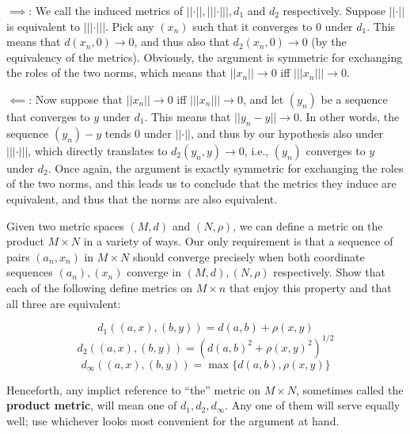 \begin{solution}
    \newcommand{\trvert}[1]{\lvert \lvert \lvert #1 \rvert \rvert \rvert}

    $\implies$: We call the induced metrics of $\lvert \lvert \cdot \rvert \rvert, \trvert{\cdot}, d_1$ and $d_2$ respectively. 
    Suppose $\lvert \lvert \cdot \rvert \rvert$ is equivalent to $\trvert{\cdot}$.
    Pick any $(x_n)$ such that it converges to 0 under $d_1$.
    This means that $d(x_n, 0) \rightarrow 0$, and thus also that $d_2(x_n, 0) \rightarrow 0$ (by the equivalency of the metrics).
    Obviously, the argument is symmetric for exchanging the roles of the two norms, which means that $\lvert \lvert x_n \rvert \rvert \rightarrow 0$ iff $\trvert{x_n} \rightarrow 0$.

    $\impliedby$: Now suppose that $\lvert \lvert x_n \rvert \rvert \rightarrow 0$ iff $\trvert{x_n} \rightarrow 0$, and let $(y_n)$ be a sequence that converges to $y$ under $d_1$.
    This means that $\lvert \lvert y_n - y \rvert \rvert \rightarrow 0$.
    In other words, the sequence $(y_n) - y$ tends 0 under $\lvert \lvert \cdot \rvert \rvert$, and thus by our hypothesis also under $\trvert{\cdot}$, which directly translates to $d_2(y_n, y) \rightarrow 0$, i.e., $(y_n)$ converges to $y$ under $d_2$.
    Once again, the argument is exactly symmetric for exchanging the roles of the two norms, and this leads us to conclude that the metrics they induce are equivalent, and thus that the norms are also equivalent.
\end{solution}

\newpage

\begin{exercise}{46}
    Given two metric spaces $(M, d)$ and $(N, \rho)$, we can define a metric on the product $M \times N$ in a variety of ways.
    Our only requirement is that a sequence of pairs $(a_n, x_n)$ in $M \times N$ should converge precisely when both coordinate sequences $(a_n), (x_n)$ converge in $(M, d), (N, \rho)$ respectively.
    Show that each of the following define metrics on $M \times n$ that enjoy this property and that all three are equivalent:

    $$d_1((a, x), (b, y)) = d(a, b) + \rho(x, y)$$
    $$d_2((a, x), (b, y)) = (d(a, b)^2 + \rho(x, y)^2)^{1/2}$$
    $$d_{\infty}((a, x), (b, y)) = \max\{d(a, b), \rho(x, y)\}$$

    Henceforth, any implict reference to ``the'' metric on $M \times N$, sometimes called the \textbf{product metric}, will mean one of $d_1, d_2, d_{\infty}$.
    Any one of them will serve equally well; use whichever looks most convenient for the argument at hand.
\end{exercise}

